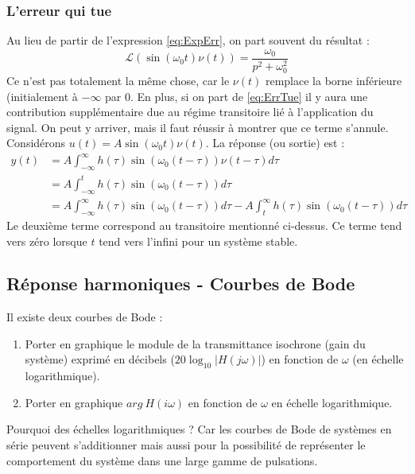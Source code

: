 \subsubsection{L'erreur qui tue}
Au lieu de partir de l'expression \autoref{eq:ExpErr}, on part souvent du résultat : 
\begin{equation}
	\mathcal{L}(\sin(\omega_0t)\nu(t)) = \frac{\omega_0}{p^2+\omega_0^2}
	\label{eq:ErrTue}
\end{equation}
Ce n'est pas totalement la même chose, car le $\nu(t)$ remplace la borne inférieure 
(initialement à $-\infty$ par 0. En plus, si on part de \autoref{eq:ErrTue} il y 
aura une contribution supplémentaire due au régime transitoire lié à l'application du
signal. On peut y arriver, mais il faut réussir à montrer que ce terme s'annule.\\
Considérons $u(t) = A\sin(\omega_0t)\nu(t)$. La réponse (ou sortie) est :
\begin{equation}
	\begin{array}{ll}
		y(t) & = A\int_{-\infty}^\infty h(\tau)\sin(\omega_0(t-\tau))\nu(t-\tau)d\tau         \\
		     & = A\int_{-\infty}^t h(\tau)\sin(\omega_0(t-\tau))d\tau                         \\
		     & = A\int_{-\infty}^\infty h(\tau)\sin(\omega_0(t-\tau))d\tau - A\int_{t}^\infty 
		h(\tau)\sin(\omega_0(t-\tau))d\tau
	\end{array}
\end{equation}
Le deuxième terme correspond au transitoire mentionné ci-dessus. Ce terme tend vers
zéro lorsque $t$ tend vers l'infini pour un système stable.


	
\subsection{Réponse harmoniques - Courbes de Bode}
Il existe deux courbes de Bode :
\begin{enumerate}
	\item Porter en graphique le module de la transmittance isochrone (gain du système) exprimé 
	      en décibels ($20\log_10|H(j\omega)|$) en fonction de $\omega$ (en échelle logarithmique).
	\item Porter en graphique $arg\ H(i\omega)$ en fonction de $\omega$ en échelle logarithmique.
\end{enumerate}
Pourquoi des échelles logarithmiques ? Car les courbes de Bode de systèmes en série peuvent 
s'additionner mais aussi pour la possibilité de représenter le comportement du système dans 
une large gamme de pulsations.\\
	
